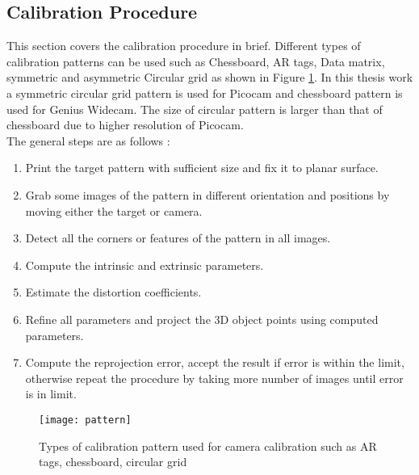 \subsection{Calibration Procedure}
This section covers the calibration procedure in brief. Different types of calibration patterns can be used such as Chessboard, AR tags, Data matrix, symmetric and asymmetric Circular grid as shown in Figure \ref{fig:pattern}. In this thesis work a symmetric circular grid pattern is used for Picocam and chessboard pattern is used for Genius Widecam. The size of circular pattern is larger than that of chessboard due to higher resolution of Picocam.\\
\newline
The general steps are as follows \cite{cameracalib}:
\begin{enumerate}
	\item Print the target pattern with sufficient size and fix it to planar surface.
	\item Grab some images of the pattern in different orientation and positions by moving either the target or camera.
	\item Detect all the corners or features of the pattern in all images.
	\item Compute the intrinsic and extrinsic parameters.
	\item Estimate the distortion coefficients.
	\item Refine all parameters and project the 3D object points using computed parameters.
	\item Compute the reprojection error, accept the result if error is within the limit, otherwise repeat the procedure by taking more number of images until error is in limit.
\end{enumerate}
\begin{figure}[h!]
	\centering
	\texttt{[image: pattern]}
	\caption{Types of calibration pattern used for camera calibration such as AR tags, chessboard, circular grid \cite{calibio}}
	\label{fig:pattern}
\end{figure}

